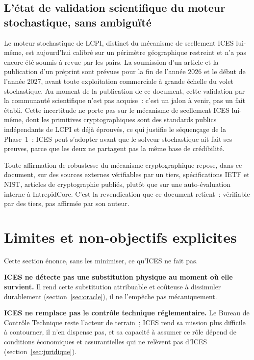 \documentclass[11pt,a4paper]{article}
\begin{document}
\subsection{L'état de validation scientifique du moteur stochastique, sans ambiguïté}

Le moteur stochastique de LCPI, distinct du mécanisme de scellement ICES lui-même, est aujourd'hui calibré sur un périmètre géographique restreint et n'a pas encore été soumis à revue par les pairs. La soumission d'un article et la publication d'un préprint sont prévues pour la fin de l'année 2026 et le début de l'année 2027, avant toute exploitation commerciale à grande échelle du volet stochastique. Au moment de la publication de ce document, cette validation par la communauté scientifique n'est pas acquise~: c'est un jalon à venir, pas un fait établi. Cette incertitude ne porte pas sur le mécanisme de scellement ICES lui-même, dont les primitives cryptographiques sont des standards publics indépendants de LCPI et déjà éprouvés, ce qui justifie le séquençage de la Phase~1~: ICES peut s'adopter avant que le solveur stochastique ait fait ses preuves, parce que les deux ne partagent pas la même base de crédibilité.

Toute affirmation de robustesse du mécanisme cryptographique repose, dans ce document, sur des sources externes vérifiables par un tiers, spécifications IETF et NIST, articles de cryptographie publiés, plutôt que sur une auto-évaluation interne à IntrepidCore. C'est la revendication que ce document retient~: vérifiable par des tiers, pas affirmée par son auteur.

\section{Limites et non-objectifs explicites}\label{sec:limites}

Cette section énonce, sans les minimiser, ce qu'ICES ne fait pas.

\textbf{ICES ne détecte pas une substitution physique au moment où elle survient.} Il rend cette substitution attribuable et coûteuse à dissimuler durablement (section~\ref{sec:oracle}), il ne l'empêche pas mécaniquement.

\textbf{ICES ne remplace pas le contrôle technique réglementaire.} Le Bureau de Contrôle Technique reste l'acteur de terrain~; ICES rend sa mission plus difficile à contourner, il n'en dispense pas, et sa capacité à assumer ce rôle dépend de conditions économiques et assurantielles qui ne relèvent pas d'ICES (section~\ref{sec:juridique}).
\end{document}

